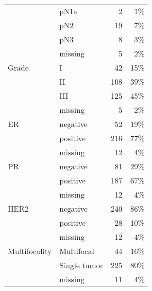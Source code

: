 \begin{table}[ht]
\begin{tabular}{llrr}
   & pN1a & 2 & 1\% \\ 
   & pN2 & 19 & 7\% \\ 
   & pN3 & 8 & 3\% \\ 
   & missing & 5 & 2\% \\ 
Grade & I & 42 & 15\% \\ 
   & II & 108 & 39\% \\ 
   & III & 125 & 45\% \\ 
   & missing & 5 & 2\% \\ 
ER & negative & 52 & 19\% \\ 
   & positive & 216 & 77\% \\ 
   & missing & 12 & 4\% \\ 
PR & negative & 81 & 29\% \\ 
   & positive & 187 & 67\% \\ 
   & missing & 12 & 4\% \\ 
HER2 & negative & 240 & 86\% \\ 
   & positive & 28 & 10\% \\ 
   & missing & 12 & 4\% \\ 
Multifocality & Multifocal & 44 & 16\% \\ 
   & Single tumor & 225 & 80\% \\ 
   & missing & 11 & 4\% \\ 
   \hline
\end{tabular}
\endgroup
\end{table}
